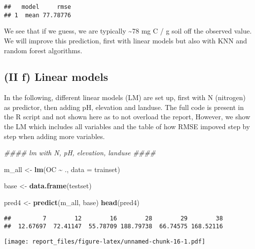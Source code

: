 \documentclass[
]{article}
\newenvironment{Shaded}{\begin{snugshade}}{\end{snugshade}}
\newcommand{\CommentTok}[1]{\textcolor[rgb]{0.56,0.35,0.01}{\textit{#1}}}
\newcommand{\DataTypeTok}[1]{\textcolor[rgb]{0.13,0.29,0.53}{#1}}
\newcommand{\KeywordTok}[1]{\textcolor[rgb]{0.13,0.29,0.53}{\textbf{#1}}}
\newcommand{\NormalTok}[1]{#1}
\newcommand{\OperatorTok}[1]{\textcolor[rgb]{0.81,0.36,0.00}{\textbf{#1}}}
\newcommand{\StringTok}[1]{\textcolor[rgb]{0.31,0.60,0.02}{#1}}
\begin{document}
\begin{verbatim}
##   model     rmse
## 1  mean 77.78776
\end{verbatim}

We see that if we guess, we are typically \textasciitilde78 mg C / g
soil off the observed value. We will improve this prediction, first with
linear models but also with KNN and random forest algorithms.

\hypertarget{ii-f-linear-models}{%
\subsection{(II f) Linear models}\label{ii-f-linear-models}}

In the following, different linear models (LM) are set up, first with N
(nitrogen) as predictor, then adding pH, elevation and landuse. The full
code is present in the R script and not shown here as to not overload
the report, However, we show the LM which includes all variables and the
table of how RMSE impoved step by step when adding more variables.

\begin{Shaded}
\begin{Highlighting}[]
\CommentTok{\#\#\#\# lm with N, pH, elevation, landuse \#\#\#\#}

\NormalTok{m\_all <{-}}\StringTok{ }\KeywordTok{lm}\NormalTok{(OC }\OperatorTok{\textasciitilde{}}\StringTok{ }\NormalTok{., }\DataTypeTok{data =}\NormalTok{ trainset)}

\NormalTok{base <{-}}\StringTok{ }\KeywordTok{data.frame}\NormalTok{(testset)}

\NormalTok{pred4 <{-}}\StringTok{ }\KeywordTok{predict}\NormalTok{(m\_all, base)}
\KeywordTok{head}\NormalTok{(pred4)}
\end{Highlighting}
\end{Shaded}

\begin{verbatim}
##         7        12        16        28        29        38 
##  12.67697  72.41147  55.78709 188.79738  66.74575 168.52116
\end{verbatim}

\begin{Shaded}
\end{Shaded}

\texttt{[image: report\_files/figure-latex/unnamed-chunk-16-1.pdf]}
\end{document}

